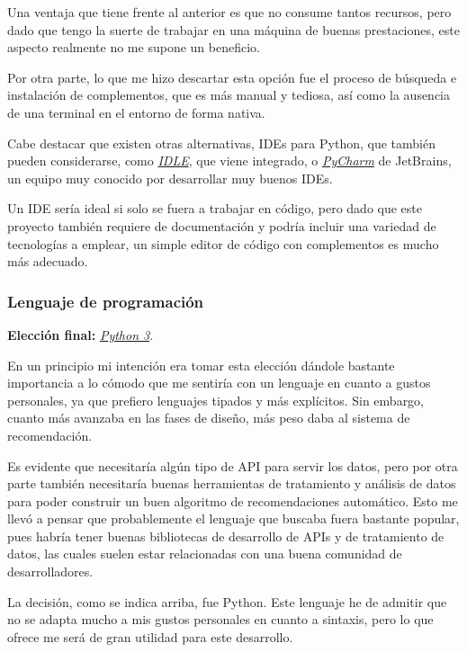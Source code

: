 Una ventaja que tiene frente al anterior es que no consume tantos recursos, pero dado que tengo la suerte de trabajar en una máquina de buenas prestaciones, este aspecto realmente no me supone un beneficio.

Por otra parte, lo que me hizo descartar esta opción fue el proceso de búsqueda e instalación de complementos, que es más manual y tediosa, así como la ausencia de una terminal en el entorno de forma nativa.

Cabe destacar que existen otras alternativas, IDEs para Python, que también pueden considerarse, como \href{https://docs.python.org/3/library/idle.html}{\textit{IDLE}}, que viene integrado, o \href{https://www.jetbrains.com/es-es/pycharm/}{\textit{PyCharm}} de JetBrains, un equipo muy conocido por desarrollar muy buenos IDEs.

Un IDE sería ideal si solo se fuera a trabajar en código, pero dado que este proyecto también requiere de documentación y podría incluir una variedad de tecnologías a emplear, un simple editor de código con complementos es mucho más adecuado.

\subsubsection{Lenguaje de programación}

\textbf{Elección final:} \href{https://www.python.org/}{\textit{Python 3}}.

En un principio mi intención era tomar esta elección dándole bastante importancia a lo cómodo que me sentiría con un lenguaje en cuanto a gustos personales, ya que prefiero lenguajes tipados y más explícitos. Sin embargo, cuanto más avanzaba en las fases de diseño, más peso daba al sistema de recomendación. 

Es evidente que necesitaría algún tipo de API para servir los datos, pero por otra parte también necesitaría buenas herramientas de tratamiento y análisis de datos para poder construir un buen algoritmo de recomendaciones automático. Esto me llevó a pensar que probablemente el lenguaje que buscaba fuera bastante popular, pues habría tener buenas bibliotecas de desarrollo de APIs y de tratamiento de datos, las cuales suelen estar relacionadas con una buena comunidad de desarrolladores.

La decisión, como se indica arriba, fue Python. Este lenguaje he de admitir que no se adapta mucho a mis gustos personales en cuanto a sintaxis, pero lo que ofrece me será de gran utilidad para este desarrollo.

